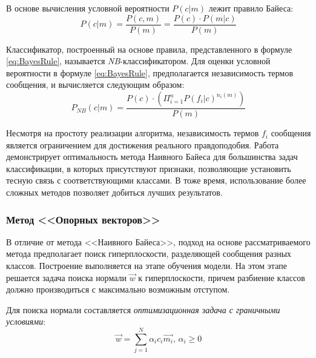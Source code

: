         В основе вычисления условной вероятности $P(c|m)$ лежит правило Байеса:
        \begin{equation}
            \label{eq:BayesRule}
            P(c|m) = \dfrac{P(c, m)}{P(m)} = \dfrac{P(c)\cdot P(m|c)}{P(m)}
        \end{equation}

        Классификатор, построенный на основе правила, представленного в
        формуле \ref{eq:BayesRule}, называется {\it NB}-классификатором.
        Для оценки условной вероятности в формуле \ref{eq:BayesRule}, предполагается
        независимость термов сообщения, и вычисляется следующим образом:
        \begin{equation}
            P_{NB} (c|m) = \dfrac{P(c)\cdot(\Pi_{i=1}^{n}P(f_i|c)^{n_i(m)})}{P(m)} \nonumber
        \end{equation}

        Несмотря на простоту реализации алгоритма, независимость термов $f_i$ сообщения
        является ограничением для достижения реального правдоподобия. Работа \cite{nbAdvantages}
        демонстрирует оптимальность метода Наивного Байеса для большинства задач
        классификации, в которых присутствуют признаки, позволяющие установить
        тесную связь с соответствующими классами. В тоже время, использование
        более сложных методов позволяет добиться лучших результатов.

        \subsubsection{Метод <<Опорных векторов>>}
        В отличие от метода <<Наивного Байеса>>, подход на основе рассматриваемого
        метода предполагает поиск гиперплоскости, разделяющей сообщения разных классов.
        Построение выполняется на этапе обучения модели. На этом этапе решается задача
        поиска нормали $\vec{w}$ к гиперплоскости, причем разбиение классов должно
        производиться с максимально возможным отступом.

        Для поиска нормали составляется {\it оптимизационная задача с граничными
        условиями}:
        \begin{equation}
            \label{eq:optimizationSVM}
            \vec{w} = \sum_{j=1}^{N} \alpha_i c_i \vec{m_i}, \hspace{2pt} \alpha_i \geq 0
        \end{equation}

